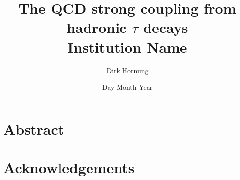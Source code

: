\documentclass[12pt,a4paper]{report}
\makeatletter
\numberwithin{equation}{section}       %
\let\org@subfile
\renewcommand*{}[1]{%
  \filename@parse{#1}%
  \expandafter
  \graphicspath\expandafter{\expandafter{\filename@area}}%
  \org@subfile{#1}%
}
\makeatother
\begin{document}
  \title{
    {The \textsc{QCD} strong coupling from hadronic $\tau$ decays}\\
    {\large Institution Name}\\
  }
  \author{Dirk Hornung}
  \date{Day Month Year}
  \maketitle

  \newpage
  \chapter*{Abstract}


  \chapter*{Acknowledgements}

  
  
  
  
  
  

  \printbibliography
  \printnomenclature
\end{document}
